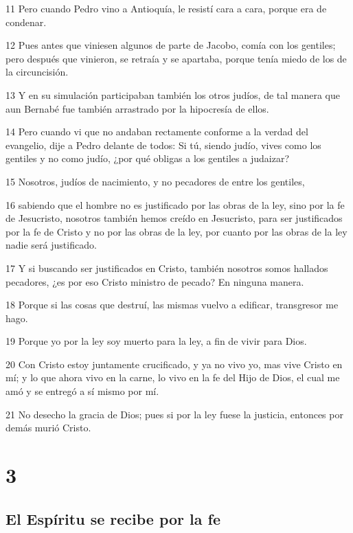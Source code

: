 \par 11 Pero cuando Pedro vino a Antioquía, le resistí cara a cara, porque era de condenar.
\par 12 Pues antes que viniesen algunos de parte de Jacobo, comía con los gentiles; pero después que vinieron, se retraía y se apartaba, porque tenía miedo de los de la circuncisión.
\par 13 Y en su simulación participaban también los otros judíos, de tal manera que aun Bernabé fue también arrastrado por la hipocresía de ellos.
\par 14 Pero cuando vi que no andaban rectamente conforme a la verdad del evangelio, dije a Pedro delante de todos: Si tú, siendo judío, vives como los gentiles y no como judío, ¿por qué obligas a los gentiles a judaizar?
\par 15 Nosotros, judíos de nacimiento, y no pecadores de entre los gentiles,
\par 16 sabiendo que el hombre no es justificado por las obras de la ley, sino por la fe de Jesucristo, nosotros también hemos creído en Jesucristo, para ser justificados por la fe de Cristo y no por las obras de la ley, por cuanto por las obras de la ley nadie será justificado.
\par 17 Y si buscando ser justificados en Cristo, también nosotros somos hallados pecadores, ¿es por eso Cristo ministro de pecado? En ninguna manera.
\par 18 Porque si las cosas que destruí, las mismas vuelvo a edificar, transgresor me hago.
\par 19 Porque yo por la ley soy muerto para la ley, a fin de vivir para Dios.
\par 20 Con Cristo estoy juntamente crucificado, y ya no vivo yo, mas vive Cristo en mí; y lo que ahora vivo en la carne, lo vivo en la fe del Hijo de Dios, el cual me amó y se entregó a sí mismo por mí.
\par 21 No desecho la gracia de Dios; pues si por la ley fuese la justicia, entonces por demás murió Cristo.

\chapter{3}

\section*{El Espíritu se recibe por la fe}

